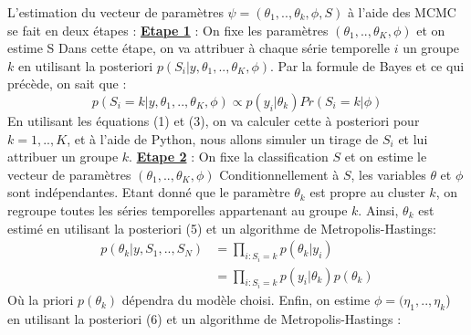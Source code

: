 L'estimation du vecteur de paramètres $\psi = (\theta_1,..,\theta_k,\phi,S)$ à l'aide des MCMC se fait en deux étapes :
\newline
\vspace{0.4cm} 
\newline
\underline{\textbf{Etape 1}} : 
\newline 
On fixe les paramètres \textit{$(\theta_1,..,\theta_K,\phi)$} et on estime S 
\newline
Dans cette étape, on va attribuer à chaque série temporelle $i$ un groupe $k$ en utilisant la posteriori $p(S_i|y,\theta_1,..,\theta_K,\phi)$.
\newline
Par la formule de Bayes et ce qui précède, on sait que :
\begin{equation}
p(S_i = k|y,\theta_1,..,\theta_K,\phi) \propto p(y_i|\theta_k)Pr(S_i = k|\phi)
\end{equation}
En utilisant les équations (1) et (3), on va calculer cette à posteriori pour $k = 1,..,K$, et à l'aide de Python, nous allons simuler un tirage de $S_i$ et lui attribuer un groupe $k$.
\newline
\vspace{0.4cm} 
\newline
\underline{\textbf{Etape 2}} : 
\newline 
On fixe la classification $S$ et on estime le vecteur de paramètres \textit{$(\theta_1,..,\theta_K,\phi)$}
\newline
Conditionnellement à $S$, les variables $\theta$ et $\phi$ sont indépendantes. Etant donné que le paramètre $\theta_k$ est propre au cluster $k$, on regroupe toutes les séries temporelles appartenant au groupe $k$.
\newline
Ainsi, $\theta_k$ est estimé en utilisant la posteriori (5) et un algorithme de Metropolis-Hastings:
\begin{equation}
    \begin{split}
        p(\theta_k|y,S_1,..,S_N) &= \prod_{i : S_i = k} p(\theta_k|y_i)\\
                                 &=  \prod_{i : S_i = k} p(y_i|\theta_k)p(\theta_k)
    \end{split}
\end{equation}
Où la priori $p(\theta_k)$ dépendra du modèle choisi.
\newline
Enfin, on estime $\phi = (\eta_1,..,\eta_k$) en utilisant la posteriori (6) et un algorithme de Metropolis-Hastings : 

